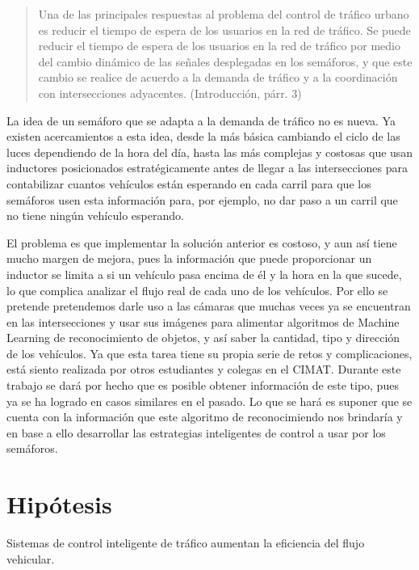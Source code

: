 \begin{quote}
Una de las principales respuestas al problema del control de tráfico
urbano es reducir el tiempo de espera de los usuarios en la red de
tráfico. Se puede reducir el tiempo de espera de los usuarios en la red
de tráfico por medio del cambio dinámico de las señales desplegadas en
los semáforos, y que este cambio se realice de acuerdo a la demanda de
tráfico y a la coordinación con intersecciones adyacentes.
(Introducción, párr. 3)
\end{quote}

La idea de un semáforo que se adapta a la demanda de tráfico no es
nueva. Ya existen acercamientos a esta idea, desde la más básica
cambiando el ciclo de las luces dependiendo de la hora del día, hasta
las más complejas y costosas que usan inductores posicionados
estratégicamente antes de llegar a las intersecciones para contabilizar
cuantos vehículos están esperando en cada carril para que los semáforos
usen esta información para, por ejemplo, no dar paso a un carril que no
tiene ningún vehículo esperando.

El problema es que implementar la solución anterior es costoso, y aun
así tiene mucho margen de mejora, pues la información que puede
proporcionar un inductor se limita a si un vehículo pasa encima de él y
la hora en la que sucede, lo que complica analizar el flujo real de cada
uno de los vehículos. Por ello se pretende pretendemos darle uso a las
cámaras que muchas veces ya se encuentran en las intersecciones y usar
sus imágenes para alimentar algoritmos de Machine Learning de
reconocimiento de objetos, y así saber la cantidad, tipo y dirección de
los vehículos. Ya que esta tarea tiene su propia serie de retos y
complicaciones, está siento realizada por otros estudiantes y colegas en
el CIMAT. Durante este trabajo se dará por hecho que es posible obtener
información de este tipo, pues ya se ha logrado en casos similares en el
pasado. Lo que se hará es suponer que se cuenta con la información que
este algoritmo de reconocimiendo nos brindaría y en base a ello
desarrollar las estrategias inteligentes de control a usar por los
semáforos.

\hypertarget{hipuxf3tesis}{%
\section{Hipótesis}\label{hipuxf3tesis}}

Sistemas de control inteligente de tráfico aumentan la eficiencia del
flujo vehicular.

